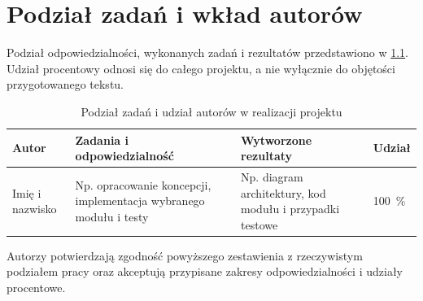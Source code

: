 
\chapter{Podział zadań i wkład autorów}
\label{chap:wklad-autorow}

Podział odpowiedzialności, wykonanych zadań i rezultatów przedstawiono
w \cref{tab:wklad-autorow}. Udział procentowy odnosi się do całego projektu,
a nie wyłącznie do objętości przygotowanego tekstu.

\begin{table}[htbp]
  \centering
  \caption{Podział zadań i udział autorów w realizacji projektu}
  \label{tab:wklad-autorow}
  \small
  \begin{tabularx}{\textwidth}{@{}p{2.8cm}X X p{1.5cm}@{}}
    \toprule
    Autor & Zadania i odpowiedzialność & Wytworzone rezultaty & Udział \\
    \midrule
    Imię i nazwisko
      & Np. opracowanie koncepcji, implementacja wybranego modułu i testy
      & Np. diagram architektury, kod modułu i przypadki testowe
      & \qty{100}{\percent} \\
    \bottomrule
  \end{tabularx}
\end{table}

Autorzy potwierdzają zgodność powyższego zestawienia z rzeczywistym podziałem
pracy oraz akceptują przypisane zakresy odpowiedzialności i udziały procentowe.

